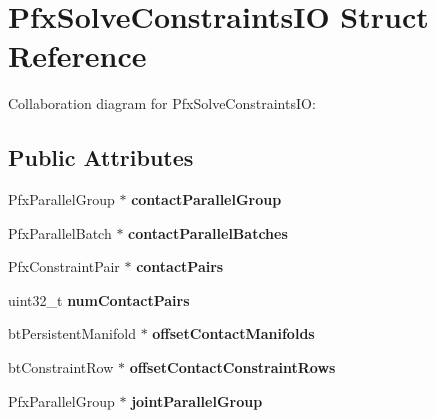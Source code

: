 \hypertarget{struct_pfx_solve_constraints_i_o}{\section{Pfx\+Solve\+Constraints\+I\+O Struct Reference}
\label{struct_pfx_solve_constraints_i_o}
}


Collaboration diagram for Pfx\+Solve\+Constraints\+I\+O\+:
\subsection*{Public Attributes}
\begin{DoxyCompactItemize}
\item 
\hypertarget{struct_pfx_solve_constraints_i_o_a1e3b7abd5ee0f2f3d10dc427ba79f12c}{Pfx\+Parallel\+Group $\ast$ {\bfseries contact\+Parallel\+Group}}\label{struct_pfx_solve_constraints_i_o_a1e3b7abd5ee0f2f3d10dc427ba79f12c}

\item 
\hypertarget{struct_pfx_solve_constraints_i_o_aa3f95c8d07576fb0ac31fa2e266af725}{Pfx\+Parallel\+Batch $\ast$ {\bfseries contact\+Parallel\+Batches}}\label{struct_pfx_solve_constraints_i_o_aa3f95c8d07576fb0ac31fa2e266af725}

\item 
\hypertarget{struct_pfx_solve_constraints_i_o_a4ce600fecd88069e6d36a8b1d312e89c}{Pfx\+Constraint\+Pair $\ast$ {\bfseries contact\+Pairs}}\label{struct_pfx_solve_constraints_i_o_a4ce600fecd88069e6d36a8b1d312e89c}

\item 
\hypertarget{struct_pfx_solve_constraints_i_o_a42e2fceb6685be04205dddf12bf8e7d9}{uint32\+\_\+t {\bfseries num\+Contact\+Pairs}}\label{struct_pfx_solve_constraints_i_o_a42e2fceb6685be04205dddf12bf8e7d9}

\item 
\hypertarget{struct_pfx_solve_constraints_i_o_a698458125bf160d97d88c3ccf80efcb1}{bt\+Persistent\+Manifold $\ast$ {\bfseries offset\+Contact\+Manifolds}}\label{struct_pfx_solve_constraints_i_o_a698458125bf160d97d88c3ccf80efcb1}

\item 
\hypertarget{struct_pfx_solve_constraints_i_o_a74d475af0fec4e9efb04469bd21aa63f}{bt\+Constraint\+Row $\ast$ {\bfseries offset\+Contact\+Constraint\+Rows}}\label{struct_pfx_solve_constraints_i_o_a74d475af0fec4e9efb04469bd21aa63f}

\item 
\hypertarget{struct_pfx_solve_constraints_i_o_a23e6109c694a132dd3a9a29cd03bfacf}{Pfx\+Parallel\+Group $\ast$ {\bfseries joint\+Parallel\+Group}}\label{struct_pfx_solve_constraints_i_o_a23e6109c694a132dd3a9a29cd03bfacf}


\end{DoxyCompactItemize}
